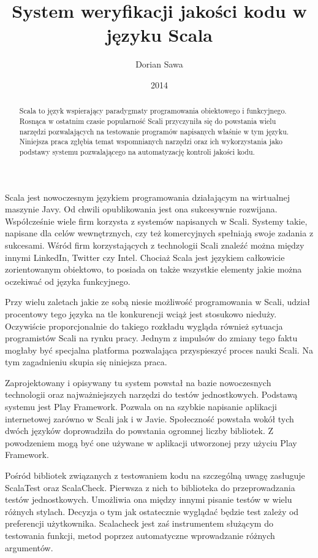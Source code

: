 \documentclass[brudnopis]{xmgr}
\author   {Dorian Sawa}
\title    {System weryfikacji jakości kodu \newline w języku Scala}
\date     {2014}
\begin{document}
\begin{abstract}
Scala to język wspierający paradygmaty programowania obiektowego i funkcyjnego. Rosnąca w ostatnim czasie popularność Scali przyczyniła się do powstania wielu narzędzi pozwalających na testowanie programów napisanych właśnie w tym języku. Niniejsza praca zgłębia temat wspomnianych narzędzi oraz ich wykorzystania jako podstawy systemu pozwalającego na automatyzację kontroli jakości kodu.
\end{abstract}

\maketitle
%
\introduction Scala jest nowoczesnym językiem programowania działającym na wirtualnej maszynie Javy. Od chwili opublikowania jest ona sukcesywnie rozwijana. Współcześnie wiele firm korzysta z systemów napisanych w Scali. Systemy takie, napisane dla celów wewnętrznych, czy też komercyjnych spełniają swoje zadania z sukcesami. Wśród firm korzystających z technologii Scali znaleźć można między innymi LinkedIn, Twitter czy Intel. Chociaż Scala jest językiem całkowicie zorientowanym obiektowo, to posiada on także wszystkie elementy jakie można oczekiwać od języka funkcyjnego.

Przy wielu zaletach jakie ze sobą niesie możliwość programowania w Scali, udział procentowy tego języka na tle konkurencji wciąż jest stosukowo nieduży. Oczywiście proporcjonalnie do takiego rozkładu wygląda również sytuacja programistów Scali na rynku pracy. Jednym z impulsów do zmiany tego faktu mogłaby być specjalna platforma pozwalająca przyspieszyć proces nauki Scali. Na tym zagadnieniu skupia się niniejsza praca.

Zaprojektowany i opisywany tu system powstał na bazie nowoczesnych technologii oraz najważniejszych narzędzi do testów jednostkowych. Podstawą systemu jest Play Framework. Pozwala on na szybkie napisanie aplikacji internetowej zarówno w Scali jak i w Javie. Społeczność powstała wokół tych dwóch języków doprowadziła do powstania ogromnej liczby bibliotek. Z powodzeniem mogą być one używane w aplikacji utworzonej przy użyciu Play Framework. 

Pośród bibliotek związanych z testowaniem kodu na szczególną uwagę zasługuje ScalaTest oraz ScalaCheck. Pierwsza z nich to biblioteka do przeprowadzania testów jednostkowych. Umożliwia ona między innymi pisanie testów w wielu różnych stylach. Decyzja o tym jak ostatecznie wyglądać będzie test zależy od preferencji użytkownika. Scalacheck jest zaś instrumentem służącym do testowania funkcji, metod poprzez automatyczne wprowadzanie różnych argumentów. 
\end{document}
